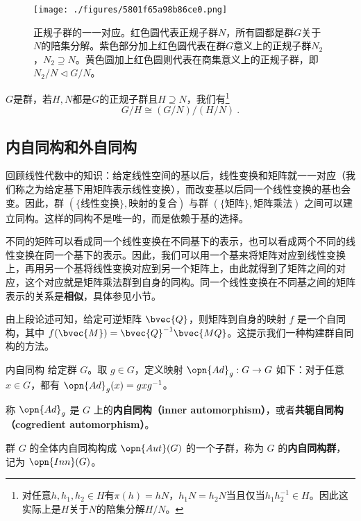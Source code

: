 \begin{figure}[ht]
\centering
\texttt{[image: ./figures/5801f65a98b86ce0.png]}
\caption{正规子群的一一对应。红色圆代表正规子群$N$，所有圆都是群$G$关于$N$的陪集分解。紫色部分加上红色圆代表在群$G$意义上的正规子群$N_2$，$N_2\supseteq N$。黄色圆加上红色圆则代表在商集意义上的正规子群，即$N_2/N\lhd G/N$。} \label{fig_Group2_2}
\end{figure}

\begin{corollary}{}
$G$是群，若$H,N$都是$G$的正规子群且$H\supseteq N$，我们有\footnote{对任意$h,h_1,h_2\in H$有$\pi(h)=hN$，$h_1N=h_2N$当且仅当$h_1h_2^{-1}\in H$。因此这实际上是$H$关于$N$的陪集分解$H/N$。}
\begin{equation}G/H\cong (G/N)/(H/N)~.\end{equation}
\end{corollary}


\subsection{内自同构和外自同构}



回顾线性代数中的知识：给定线性空间的基以后，线性变换和矩阵就一一对应（我们称之为给定基下用矩阵表示线性变换），而改变基以后同一个线性变换的基也会变。因此，群 $(\{\text{线性变换}\}, \text{映射的复合})$ 与群 $(\{\text{矩阵}\}, \text{矩阵乘法})$ 之间可以建立同构。这样的同构不是唯一的，而是依赖于基的选择。

不同的矩阵可以看成同一个线性变换在不同基下的表示，也可以看成两个不同的线性变换在同一个基下的表示。因此，我们可以用一个基来将矩阵对应到线性变换上，再用另一个基将线性变换对应到另一个矩阵上，由此就得到了矩阵之间的对应，这个对应就是矩阵乘法群到自身的同构。同一个线性变换在不同基之间的矩阵表示的关系是\textbf{相似}，具体参见小节。

由上段论述可知，给定可逆矩阵 $\bvec{Q}$，则矩阵到自身的映射 $f$ 是一个自同构，其中 $f(\bvec{M})=\bvec{Q}^{-1}\bvec{MQ}$。这提示我们一种构建群自同构的方法。

\begin{definition}{内自同构}
给定群 $G$。取 $g\in G$，定义映射 $\opn{Ad}_g:G\to G$ 如下：对于任意 $x\in G$，都有 $\opn{Ad}_g(x)=gxg^{-1}$。

称 $\opn{Ad}_g$ 是 $G$ 上的\textbf{内自同构（inner automorphism）}，或者\textbf{共轭自同构（cogredient automorphism）}。


群 $G$ 的全体内自同构构成 $\opn{Aut}(G)$ 的一个子群，称为 $G$ 的\textbf{内自同构群}， 记为 $\opn{Inn}(G)$。

\end{definition}


